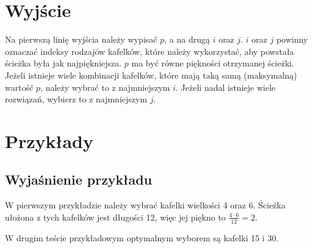 \documentclass[zad,zawodnik,utf8]{sinol}
\begin{document}
\begin{tasktext}
\section{Wyjście}
\par Na pierwszą linię wyjścia należy wypisać $p$, a na drugą $i$ oraz $j$. $i$ oraz $j$ powinny oznaczać indeksy rodzajów kafelków, które należy wykorzystać, aby powstała ścieżka była jak najpiękniejsza. $p$ ma być równe piękności otrzymanej ścieżki. Jeżeli istnieje wiele kombinacji kafelków, które mają taką samą (maksymalną) wartość $p$, należy wybrać to z najmniejszym $i$. Jeżeli nadal istnieje wiele rozwiązań, wybierz to z najmniejszym $j$.

\pagebreak
\section{Przykłady}
\end{tasktext}
\subsection{Wyjaśnienie przykładu}
\par W pierwszym przykładzie należy wybrać kafelki wielkości 4 oraz 6. Ścieżka ułożona z tych kafelków jest długości 12, więc jej piękno to $\frac{4 \cdot 6}{12} = 2$.
\par W drugim teście przykładowym optymalnym wyborem są kafelki 15 i 30.
\end{document}
